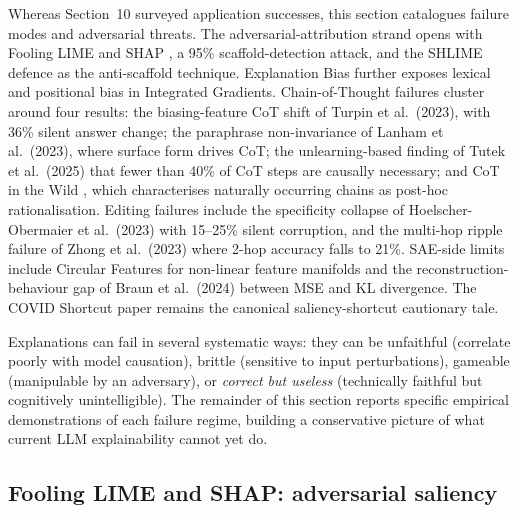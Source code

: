 \documentclass{article}
\begin{document}
Whereas Section~10 surveyed application successes, this section catalogues failure modes and adversarial threats. The adversarial-attribution strand opens with Fooling LIME and SHAP \citep{slack2020foolinglimeandshap}, a 95\% scaffold-detection attack, and the SHLIME defence \citep{chauhan2025shlimefoilingadver} as the anti-scaffold technique. Explanation Bias \citep{kamp2025explanationbiasisa} further exposes lexical and positional bias in Integrated Gradients. Chain-of-Thought failures cluster around four results: the biasing-feature CoT shift of Turpin et al.~(2023), with 36\% silent answer change; the paraphrase non-invariance of Lanham et al.~(2023), where surface form drives CoT; the unlearning-based finding of Tutek et al.~(2025) that fewer than 40\% of CoT steps are causally necessary; and CoT in the Wild \citep{arcuschin2025chainofthoughtreas}, which characterises naturally occurring chains as post-hoc rationalisation. Editing failures include the specificity collapse of Hoelscher-Obermaier et al.~(2023) with 15--25\% silent corruption, and the multi-hop ripple failure of Zhong et al.~(2023) where 2-hop accuracy falls to 21\%. SAE-side limits include Circular Features \citep{engels2024notalllanguagemode} for non-linear feature manifolds and the reconstruction-behaviour gap of Braun et al.~(2024) between MSE and KL divergence. The COVID Shortcut paper \citep{degrave2021aiforradiographicc} remains the canonical saliency-shortcut cautionary tale.

Explanations can fail in several systematic ways: they can be unfaithful (correlate poorly with model causation), brittle (sensitive to input perturbations), gameable (manipulable by an adversary), or \emph{correct but useless} (technically faithful but cognitively unintelligible). The remainder of this section reports specific empirical demonstrations of each failure regime, building a conservative picture of what current LLM explainability cannot yet do.

\subsection{Fooling LIME and SHAP: adversarial saliency}\label{fooling-lime-and-shap-adversarial-saliency}
\end{document}
